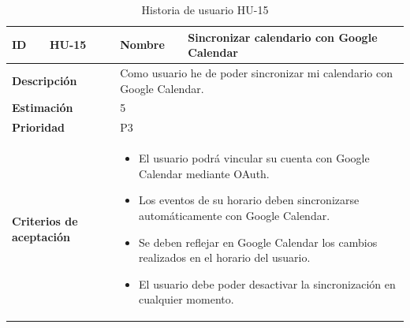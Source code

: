 \begin{table}[H]
    \centering
    \begin{tabular}{|p{2cm}|p{4cm}|p{2cm}|p{4cm}|}
        \hline
        \textbf{ID} & HU-15 & \textbf{Nombre} & Sincronizar calendario con Google Calendar \\
        \hline
        \multicolumn{2}{|p{6cm}|}{\textbf{Descripción}} & \multicolumn{2}{p{6cm}|}{Como usuario he de poder sincronizar mi calendario con Google Calendar.} \\
        \hline
        \multicolumn{2}{|p{6cm}|}{\textbf{Estimación}} & \multicolumn{2}{p{6cm}|}{5} \\
        \hline
        \multicolumn{2}{|p{6cm}|}{\textbf{Prioridad}} & \multicolumn{2}{p{6cm}|}{P3} \\
        \hline
        \multicolumn{2}{|p{6cm}|}{\textbf{Criterios de aceptación}} & \multicolumn{2}{p{6cm}|}{
            \begin{itemize}
                \item El usuario podrá vincular su cuenta con Google Calendar mediante OAuth.
                \item Los eventos de su horario deben sincronizarse automáticamente con Google Calendar.
                \item Se deben reflejar en Google Calendar los cambios realizados en el horario del usuario.
                \item El usuario debe poder desactivar la sincronización en cualquier momento.
            \end{itemize}
        } \\
        \hline
    \end{tabular}
    \caption{Historia de usuario HU-15}
    \label{tab:hu_15}
\end{table}

